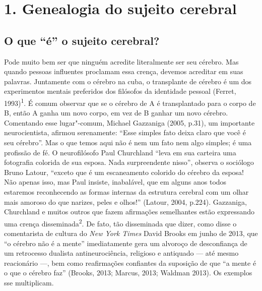 \part{1. Genealogia do sujeito cerebral}

\chapter{O que ``é'' o sujeito cerebral?}

Pode muito bem ser que ninguém acredite literalmente ser seu cérebro.
Mas quando pessoas influentes proclamam essa crença, devemos acreditar
em suas palavras. Juntamente com o cérebro na cuba, o transplante de
cérebro é um dos experimentos mentais preferidos dos filósofos da
identidade pessoal (Ferret, 1993)\textsuperscript{1}. É comum observar
que se o cérebro de A é transplantado para o corpo de B, então A ganha
um novo corpo, em vez de B ganhar um novo cérebro. Comentando esse
lugar"-comum, Michael Gazzaniga (2005, p.31), um importante
neurocientista, afirmou serenamente: ``Esse simples fato deixa claro que
você é seu cérebro''. Mas o que temos aqui não é nem um fato nem algo
simples; é uma profissão de fé. O neurofilósofo Paul Churchland ``leva
em sua carteira uma fotografia colorida de sua esposa. Nada
surpreendente nisso'', observa o sociólogo Bruno Latour, ``exceto que é
um escaneamento colorido do cérebro da esposa! Não apenas isso, mas Paul
insiste, inabalável, que em alguns anos todos estaremos reconhecendo as
formas internas da estrutura cerebral com um olhar mais amoroso do que
narizes, peles e olhos!'' (Latour, 2004, p.224). Gazzaniga, Churchland e
muitos outros que fazem afirmações semelhantes estão expressando uma
crença disseminada\textsuperscript{2}. De fato, tão disseminada que
dizer, como disse o comentarista de cultura do \emph{New York Times}
David Brooks em junho de 2013, que ``o cérebro não é a mente''
imediatamente gera um alvoroço de desconfiança de um retrocesso dualista
antineurociência, religioso e antiquado --- até mesmo reacionário ---,
bem como reafirmações confiantes da suposição de que ``a mente é o que o
cérebro faz'' (Brooks, 2013; Marcus, 2013; Waldman 2013). Os exemplos
sse multiplicam.

